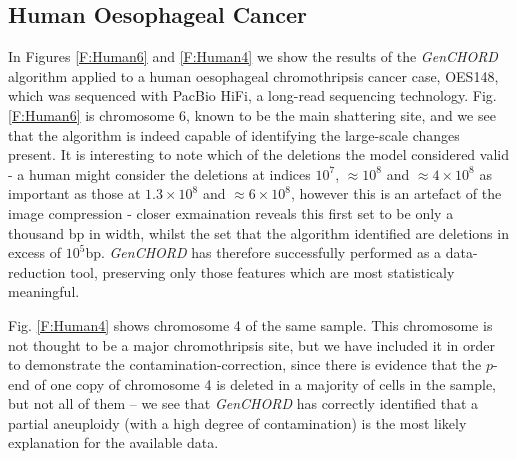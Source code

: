 \documentclass[fleqn,usenatbib]{acmart}
\def\codename{\textit{GenCHORD}}
\begin{document}
				\subsection{Human Oesophageal Cancer}
					In Figures \ref{F:Human6} and \ref{F:Human4} we show the results of the \codename{} algorithm applied to a human oesophageal chromothripsis cancer case, OES148, which was sequenced with {PacBio HiFi, a long-read sequencing technology}. Fig. \ref{F:Human6} is chromosome 6, known to be the main shattering site, and we see that the algorithm is indeed capable of identifying the large-scale changes present. {It is interesting to note which of the deletions the model considered valid - a human might consider the deletions at indices $10^7$, $\approx 10^8$ and $\approx 4 \times 10^8$ as important as those at $1.3\times10^8$ and $\approx 6\times 10^8$, however this is an artefact of the image compression - closer exmaination reveals this first set to be only a thousand bp in width, whilst the set that the algorithm identified are deletions in excess of $10^5$bp. \codename{} has therefore successfully performed as a data-reduction tool, preserving only those features which are most statisticaly meaningful.} 
					
					
					{Fig. \ref{F:Human4} shows chromosome 4 of the same sample.} This chromosome is not thought to be a major chromothripsis site, but we have included it in order to demonstrate the contamination-correction, since there is evidence that the $p$-end of one copy of chromosome 4 is deleted in a majority of cells in the sample, but not all of them -- we see that \codename{} has correctly identified that a partial aneuploidy (with a high degree of contamination) is the most likely explanation for the available data.
				
\end{document}
